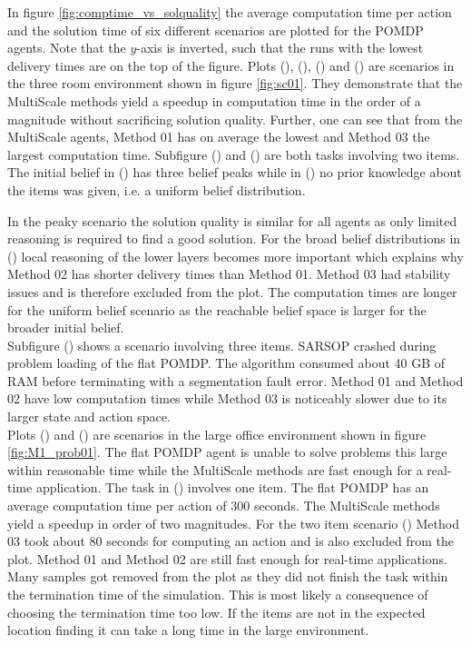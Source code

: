 In figure \ref{fig:comptime_vs_solquality} the average computation time per action and the solution time of six different scenarios are plotted for the POMDP agents. Note that the $y$-axis is inverted, such that the runs with the lowest delivery times are on the top of the figure. Plots (), (), () and () are scenarios in the three room environment shown in figure \ref{fig:sc01}. They demonstrate that the MultiScale methods yield a speedup in computation time in the order of a magnitude without sacrificing solution quality. Further, one can see that from the MultiScale agents, Method 01 has on average the lowest and Method 03 the largest computation time.
Subfigure () and () are both tasks involving two items. The initial belief in () has three belief peaks while in () no prior knowledge about the items was given, i.e. a uniform belief distribution.

In the peaky scenario the solution quality is similar for all agents as only limited reasoning is required to find a good solution. For the broad belief distributions in () local reasoning of the lower layers becomes more important which explains why Method 02 has shorter delivery times than Method 01.  Method 03 had stability issues and is therefore excluded from the plot. The computation times are longer for the uniform belief scenario as the reachable belief space is larger for the broader initial belief.\\
Subfigure () shows a scenario involving three items. SARSOP crashed during problem loading of the flat POMDP. The algorithm consumed about 40 GB of RAM before terminating with a segmentation fault error. Method 01 and Method 02 have low computation times while Method 03 is noticeably slower due to its larger state and action space.\\
Plots () and () are scenarios in the large office environment shown in figure \ref{fig:M1_prob01}. The flat POMDP agent is unable to solve problems this large within reasonable time while the MultiScale methods are fast enough for a real-time application. The task in () involves one item. The flat POMDP has an average computation time per action of 300 seconds. The MultiScale methods yield a speedup in order of two magnitudes. For the two item scenario () Method 03 took about 80 seconds for computing an action and is also excluded from the plot. Method 01 and Method 02 are still fast enough for real-time applications. Many samples got removed from the plot as they did not finish the task within the termination time of the simulation. This is most likely a consequence of choosing the termination time too low. If the items are not in the expected location finding it can take a long time in the large environment. \\


